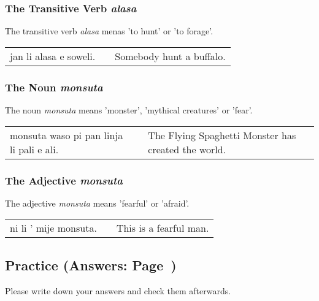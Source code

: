 %
\subsubsection*{The Transitive Verb \textit{alasa}}
%

The transitive verb \textit{alasa} menas 'to hunt' or 'to forage'.

\begin{supertabular}{p{5,5cm}|ll}
jan li alasa e soweli. && Somebody hunt a buffalo. \\
\end{supertabular}

%
%
\subsubsection*{The Noun \textit{monsuta}}
%

The noun \textit{monsuta} means 'monster', 'mythical creatures' or 'fear'.

\begin{supertabular}{p{5,5cm}|ll}
monsuta waso pi pan linja li pali e ali. &&  The Flying Spaghetti Monster has created the world. \\
\end{supertabular}

%
\subsubsection*{The Adjective \textit{monsuta}}
%

The adjective \textit{monsuta} means 'fearful' or 'afraid'.

\begin{supertabular}{p{5,5cm}|ll}
ni li ' mije monsuta. && This is a fearful man. \\
\end{supertabular}
%
%
%
\newpage
%
\subsection*{Practice (Answers: Page~\pageref{'living_things'})}
%
Please write down your answers and check them afterwards. 

